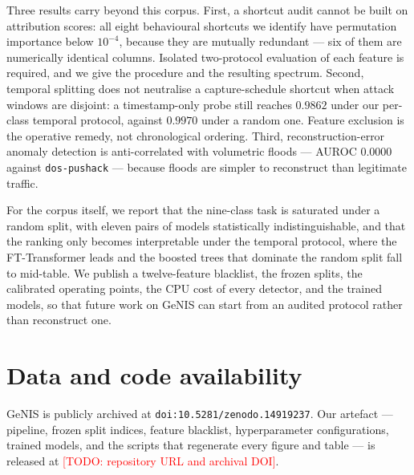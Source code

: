 \documentclass[review,12pt]{elsarticle}
\newcommand{\todo}[1]{\textcolor{red}{[TODO: #1]}}
\begin{document}
Three results carry beyond this corpus. First, a shortcut audit cannot be built on
attribution scores: all eight behavioural shortcuts we identify have permutation
importance below $10^{-4}$, because they are mutually redundant --- six of them are
numerically identical columns. Isolated two-protocol evaluation of each feature is
required, and we give the procedure and the resulting spectrum. Second, temporal
splitting does not neutralise a capture-schedule shortcut when attack windows are
disjoint: a timestamp-only probe still reaches $0.9862$ under our per-class temporal
protocol, against $0.9970$ under a random one. Feature exclusion is the operative remedy,
not chronological ordering. Third, reconstruction-error anomaly detection is
anti-correlated with volumetric floods --- AUROC $0.0000$ against \texttt{dos-pushack} ---
because floods are simpler to reconstruct than legitimate traffic.

For the corpus itself, we report that the nine-class task is saturated under a random
split, with eleven pairs of models statistically indistinguishable, and that the ranking
only becomes interpretable under the temporal protocol, where the FT-Transformer leads
and the boosted trees that dominate the random split fall to mid-table. We publish a
twelve-feature blacklist, the frozen splits, the calibrated operating points, the CPU cost
of every detector, and the trained models, so that future work on GeNIS can start from an
audited protocol rather than reconstruct one.

\section*{Data and code availability}
GeNIS is publicly archived at \texttt{doi:10.5281/zenodo.14919237}. Our artefact ---
pipeline, frozen split indices, feature blacklist, hyperparameter configurations,
trained models, and the scripts that regenerate every figure and table --- is released at
\todo{repository URL and archival DOI}.



\end{document}
